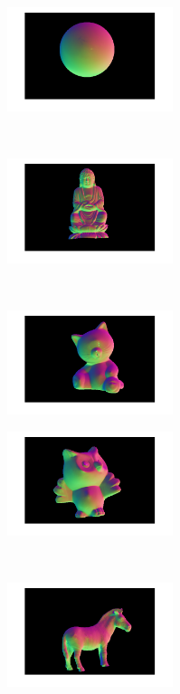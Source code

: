 \documentclass{paper}
\begin{document}
\begin{figure}[h!]
    \centering
    \begin{subfigure}[]{0.33\textwidth}
        \centering
        \includegraphics[height=1.2in]{sphereNM}
    \end{subfigure}%
    ~ 
    \begin{subfigure}[]{0.33\textwidth}
        \centering
        \includegraphics[height=1.2in]{buddhaNM}
    \end{subfigure}%
    ~ 
    \begin{subfigure}[]{0.33\textwidth}
        \centering
        \includegraphics[height=1.2in]{catNM}
    \end{subfigure}
        \begin{subfigure}[]{0.33\textwidth}
        \centering
        \includegraphics[height=1.2in]{owlNM}
    \end{subfigure}%
    ~ 
    \begin{subfigure}[]{0.33\textwidth}
        \centering
        \includegraphics[height=1.2in]{zebraNM}

\end{subfigure}
\end{figure}
\end{document}
